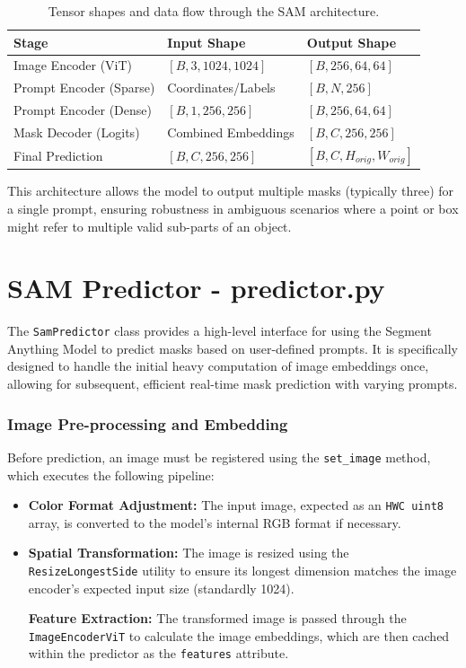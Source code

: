 \begin{table}[H]
	\centering
	\begin{tabular}{|l|l|l|}
		\hline
		\textbf{Stage} & \textbf{Input Shape} & \textbf{Output Shape} \\ \hline
		Image Encoder (ViT) & $[B, 3, 1024, 1024]$ & $[B, 256, 64, 64]$ \\ \hline
		Prompt Encoder (Sparse) & Coordinates/Labels & $[B, N, 256]$ \\ \hline
		Prompt Encoder (Dense) & $[B, 1, 256, 256]$ & $[B, 256, 64, 64]$ \\ \hline
		Mask Decoder (Logits) & Combined Embeddings & $[B, C, 256, 256]$ \\ \hline
		Final Prediction & $[B, C, 256, 256]$ & $[B, C, H_{orig}, W_{orig}]$ \\ \hline
	\end{tabular}
	\caption{Tensor shapes and data flow through the SAM architecture.}
\end{table}

This architecture allows the model to output multiple masks (typically three) for a single prompt, ensuring robustness in ambiguous scenarios where a point or box might refer to multiple valid sub-parts of an object.

\section{SAM Predictor - predictor.py}
The \texttt{SamPredictor} class provides a high-level interface for using the Segment Anything Model to predict masks based on user-defined prompts. It is specifically designed to handle the initial heavy computation of image embeddings once, allowing for subsequent, efficient real-time mask prediction with varying prompts.

\subsubsection{Image Pre-processing and Embedding}
Before prediction, an image must be registered using the \texttt{set\_image} method, which executes the following pipeline:

\begin{itemize}
	\item \textbf{Color Format Adjustment:} The input image, expected as an \texttt{HWC uint8} array, is converted to the model's internal RGB format if necessary.
	
	\item \textbf{Spatial Transformation:} The image is resized using the\\ \texttt{ResizeLongestSide} utility to ensure its longest dimension matches the image encoder's expected input size (standardly 1024).
	
	\textbf{Feature Extraction:} The transformed image is passed through the \texttt{ImageEncoderViT} to calculate the image embeddings, which are then cached within the predictor as the \texttt{features} attribute.
\end{itemize}

